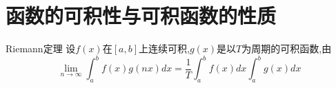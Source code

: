 \chapter{函数的可积性与可积函数的性质}

\begin{theorem}{Riemann定理}
	设$f(x)$在$[a,b]$上连续可积,$g(x)$是以$T$为周期的可积函数,由
	$$
		\lim_{n\rightarrow \infty}\int_a^b{f\left( x \right) g\left( nx \right) dx}=\frac{1}{T}\int_a^b{f\left( x \right) dx}\int_a^b{g\left( x \right) dx}
	$$
\end{theorem}
